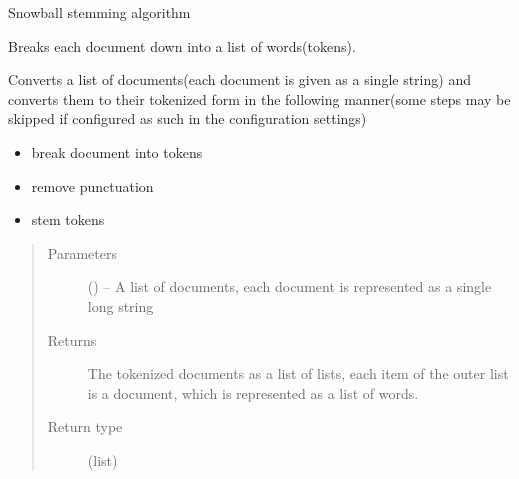 \documentclass[letterpaper,10pt,english]{sphinxmanual}
\begin{document}
\begin{fulllineitems}
\begin{fulllineitems}
\end{fulllineitems}


\begin{fulllineitems}
\label{\detokenize{KUHERD:KUHERD.HerdVectorizer.HerdVectorizer.snowball_stemmer}}
Snowball stemming algorithm

\end{fulllineitems}


\begin{fulllineitems}
\label{\detokenize{KUHERD:KUHERD.HerdVectorizer.HerdVectorizer.tokenize_docs}}
Breaks each document down into a list of words(tokens).

Converts a list of documents(each document is given as a single string) and converts them to their tokenized
form in the following manner(some steps may be skipped if configured as such in the configuration settings)
\begin{itemize}
\item {} 
break document into tokens

\item {} 
remove punctuation

\item {} 
stem tokens

\end{itemize}
\begin{quote}\begin{description}
\item[{Parameters}] \leavevmode
{} () -- A list of documents, each document is represented as a single long string

\item[{Returns}] \leavevmode
The tokenized documents as a list of lists, each item of the outer list is a document, which is represented as a list of words.

\item[{Return type}] \leavevmode
(list)

\end{description}\end{quote}


\end{fulllineitems}
\end{fulllineitems}
\end{document}
